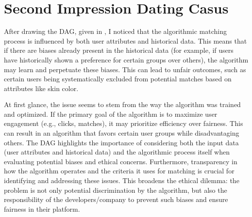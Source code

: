 \documentclass[11pt, twoside]{article}
\numberwithin{equation}{section}
\newcommand{\fullref}[1]{\hyperref[#1]{\Cref{#1}}}
\begin{document}
\section{Second Impression Dating Casus}
After drawing the DAG, given in \fullref{fig:DAG}, I noticed that the algorithmic matching process is influenced by both user attributes and historical data. This means that if there are biases already present in the historical data (for example, if users have historically shown a preference for certain groups over others), the algorithm may learn and perpetuate these biases. This can lead to unfair outcomes, such as certain users being systematically excluded from potential matches based on attributes like skin color.

At first glance, the issue seems to stem from the way the algorithm was trained and optimized. If the primary goal of the algorithm is to maximize user engagement (e.g., clicks, matches), it may prioritize efficiency over fairness. This can result in an algorithm that favors certain user groups while disadvantaging others. The DAG highlights the importance of considering both the input data (user attributes and historical data) and the algorithmic process itself when evaluating potential biases and ethical concerns. Furthermore, transparency in how the algorithm operates and the criteria it uses for matching is crucial for identifying and addressing these issues. This broadens the ethical dilemma: the problem is not only potential discrimination by the algorithm, but also the responsibility of the developers/company to prevent such biases and ensure fairness in their platform.
\end{document}
